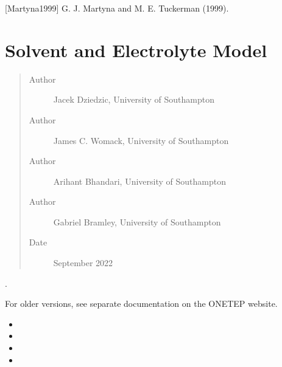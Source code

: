 \documentclass[letterpaper,10pt,english]{sphinxmanual}
\begin{document}
{[}Martyna1999{]} G. J. Martyna and M. E. Tuckerman   (1999).


\section{Solvent and Electrolyte Model}
\label{\detokenize{implicit_solvation_v3::doc}}\label{\detokenize{implicit_solvation_v3:solvent-and-electrolyte-model}}\begin{quote}\begin{description}
\item[{Author}] \leavevmode
Jacek Dziedzic, University of Southampton

\item[{Author}] \leavevmode
James C. Womack, University of Southampton

\item[{Author}] \leavevmode
Arihant Bhandari, University of Southampton

\item[{Author}] \leavevmode
Gabriel Bramley, University of Southampton

\item[{Date}] \leavevmode
September 2022

\end{description}\end{quote}

\begin{DUlineblock}{0em}
\item[] .
\item[] For older versions, see separate documentation on the ONETEP website.
\item[] 
\end{DUlineblock}
\begin{itemize}
\item {} 

\item {} 

\item {} 

\item {} 

\end{itemize}
\end{document}
